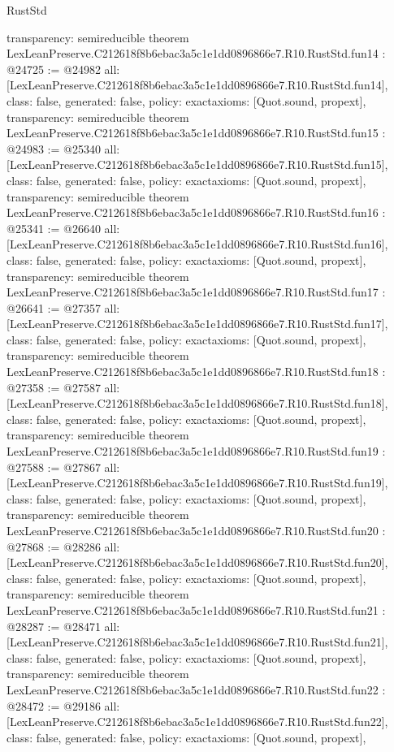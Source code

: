 \begin{lexlean}{RustStd}
\begin{coremodule}
{  transparency: semireducible
}
theorem LexLeanPreserve.C212618f8b6ebac3a5c1e1dd0896866e7.R10.RustStd.fun14 : @24725 := @24982 {
  all: [LexLeanPreserve.C212618f8b6ebac3a5c1e1dd0896866e7.R10.RustStd.fun14],
  class: false,
  generated: false,
  policy: exact{axioms: [Quot.sound, propext]},
  transparency: semireducible
}
theorem LexLeanPreserve.C212618f8b6ebac3a5c1e1dd0896866e7.R10.RustStd.fun15 : @24983 := @25340 {
  all: [LexLeanPreserve.C212618f8b6ebac3a5c1e1dd0896866e7.R10.RustStd.fun15],
  class: false,
  generated: false,
  policy: exact{axioms: [Quot.sound, propext]},
  transparency: semireducible
}
theorem LexLeanPreserve.C212618f8b6ebac3a5c1e1dd0896866e7.R10.RustStd.fun16 : @25341 := @26640 {
  all: [LexLeanPreserve.C212618f8b6ebac3a5c1e1dd0896866e7.R10.RustStd.fun16],
  class: false,
  generated: false,
  policy: exact{axioms: [Quot.sound, propext]},
  transparency: semireducible
}
theorem LexLeanPreserve.C212618f8b6ebac3a5c1e1dd0896866e7.R10.RustStd.fun17 : @26641 := @27357 {
  all: [LexLeanPreserve.C212618f8b6ebac3a5c1e1dd0896866e7.R10.RustStd.fun17],
  class: false,
  generated: false,
  policy: exact{axioms: [Quot.sound, propext]},
  transparency: semireducible
}
theorem LexLeanPreserve.C212618f8b6ebac3a5c1e1dd0896866e7.R10.RustStd.fun18 : @27358 := @27587 {
  all: [LexLeanPreserve.C212618f8b6ebac3a5c1e1dd0896866e7.R10.RustStd.fun18],
  class: false,
  generated: false,
  policy: exact{axioms: [Quot.sound, propext]},
  transparency: semireducible
}
theorem LexLeanPreserve.C212618f8b6ebac3a5c1e1dd0896866e7.R10.RustStd.fun19 : @27588 := @27867 {
  all: [LexLeanPreserve.C212618f8b6ebac3a5c1e1dd0896866e7.R10.RustStd.fun19],
  class: false,
  generated: false,
  policy: exact{axioms: [Quot.sound, propext]},
  transparency: semireducible
}
theorem LexLeanPreserve.C212618f8b6ebac3a5c1e1dd0896866e7.R10.RustStd.fun20 : @27868 := @28286 {
  all: [LexLeanPreserve.C212618f8b6ebac3a5c1e1dd0896866e7.R10.RustStd.fun20],
  class: false,
  generated: false,
  policy: exact{axioms: [Quot.sound, propext]},
  transparency: semireducible
}
theorem LexLeanPreserve.C212618f8b6ebac3a5c1e1dd0896866e7.R10.RustStd.fun21 : @28287 := @28471 {
  all: [LexLeanPreserve.C212618f8b6ebac3a5c1e1dd0896866e7.R10.RustStd.fun21],
  class: false,
  generated: false,
  policy: exact{axioms: [Quot.sound, propext]},
  transparency: semireducible
}
theorem LexLeanPreserve.C212618f8b6ebac3a5c1e1dd0896866e7.R10.RustStd.fun22 : @28472 := @29186 {
  all: [LexLeanPreserve.C212618f8b6ebac3a5c1e1dd0896866e7.R10.RustStd.fun22],
  class: false,
  generated: false,
  policy: exact{axioms: [Quot.sound, propext]},
}
\end{coremodule}
\end{lexlean}
